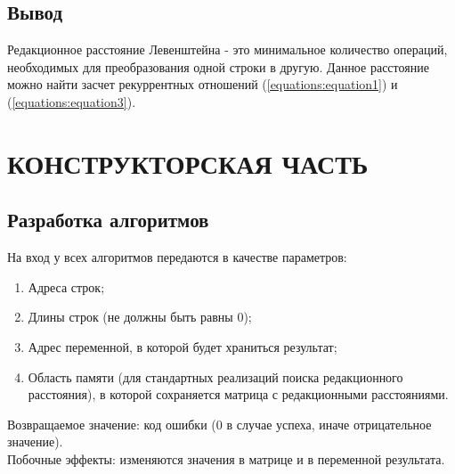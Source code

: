 \documentclass[a4paper,12pt]{article}
\begin{document}
\newpage
\subsection{Вывод}
Редакционное расстояние Левенштейна - это минимальное количество операций, необходимых для преобразования одной строки в другую. Данное расстояние можно найти засчет рекуррентных отношений (\ref{equations:equation1}) и (\ref{equations:equation3}).


\newpage
\section{КОНСТРУКТОРСКАЯ ЧАСТЬ}

\subsection{Разработка алгоритмов}
На вход у всех алгоритмов передаются в качестве параметров:
\begin{enumerate}
\item Адреса строк;
\item Длины строк (не должны быть равны 0);
\item Адрес переменной, в которой будет храниться результат;
\item Область памяти (для стандартных реализаций поиска редакционного расстояния), в которой сохраняется матрица с редакционными расстояниями.
\end{enumerate}
Возвращаемое значение: код ошибки (0 в случае успеха, иначе отрицательное значение). \\
Побочные эффекты: изменяются значения в матрице и в переменной результата.

\newpage
\end{document}
